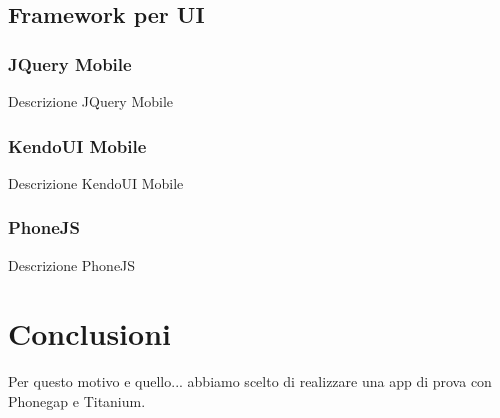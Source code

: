 			\subsection{Framework per UI}
	
				\subsubsection{JQuery Mobile}
					Descrizione JQuery Mobile
	
				\subsubsection{KendoUI Mobile}
					Descrizione KendoUI Mobile
	
				\subsubsection{PhoneJS}
					Descrizione PhoneJS

	\section{Conclusioni}
		Per questo motivo e quello... abbiamo scelto di realizzare una app di 
		prova con Phonegap e Titanium.
